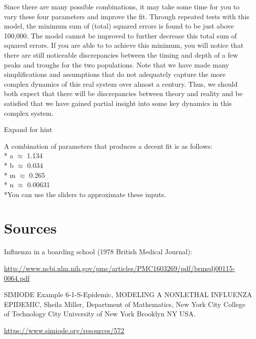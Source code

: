 \documentclass{ximera}
\begin{document}
Since there are many possible combinations, it may take some time for you to vary these four parameters and improve the fit.  Through repeated tests with this model, the minimum sum of (total) squared errors is found to be just above 100,000.  The model cannot be improved to further decrease this total sum of squared errors.  If you are able to to achieve this minimum, you will notice that there are still noticeable discrepancies between the timing and depth of a few peaks and troughs for the two populations.  Note that we have made many simplifications and assumptions that do not adequately capture the more complex dynamics of this real system over almost a century.  Thus, we should both expect that there will be discrepancies between theory and reality and be satisfied that we have gained partial insight into some key dynamics in this complex system.

Expand for hint

\begin{expandable}
A combination of parameters that produces a decent fit is as follows:
\\* a $\approx$ 1.134
\\* b $\approx$ 0.034
\\* m $\approx$ 0.265
\\* n $\approx$ 0.00631
\\*You can use the sliders to approximate these inputs.
\end{expandable}

\section*{Sources}
Influenza in a boarding school (1978 British Medical Journal): 

\href{http://www.ncbi.nlm.nih.gov/pmc/articles/PMC1603269/pdf/brmedj00115-0064.pdf}{http://www.ncbi.nlm.nih.gov/pmc/articles/PMC1603269/pdf/brmedj00115-0064.pdf}

SIMIODE Example 6-1-S-Epidemic, MODELING A NONLETHAL INFLUENZA EPIDEMIC, Sheila Miller, Department of Mathematics, New York City College of Technology City University of New York Brooklyn NY USA. 

\href{https://www.simiode.org/resources/572}{https://www.simiode.org/resources/572}
\end{document}
